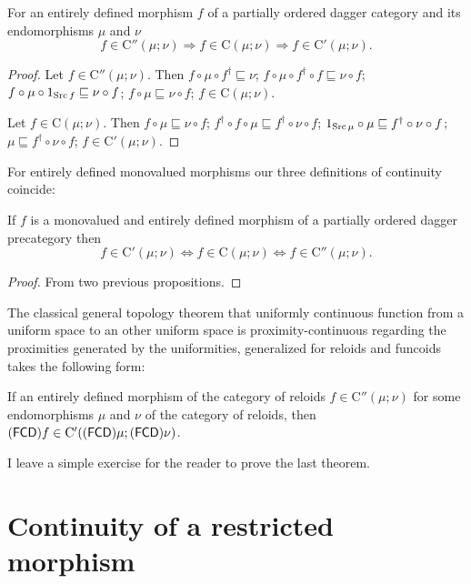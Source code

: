 \begin{prop}
For an entirely defined morphism $f$ of a partially ordered dagger
category and its endomorphisms $\mu$ and $\nu$
\[
f\in\mathrm{C}''(\mu;\nu)\Rightarrow f\in\mathrm{C}(\mu;\nu)\Rightarrow f\in\mathrm{C}'(\mu;\nu).
\]
\end{prop}
\begin{proof}
Let $f\in\mathrm{C}''(\mu;\nu)$. Then $f\circ\mu\circ f^{\dagger}\sqsubseteq\nu$;
$f\circ\mu\circ f^{\dagger}\circ f\sqsubseteq\nu\circ f$; $f\circ\mu\circ1_{\operatorname{Src} f}\sqsubseteq\nu\circ f$;
$f\circ\mu\sqsubseteq\nu\circ f$; $f\in\mathrm{C}(\mu;\nu)$.

Let $f\in\mathrm{C}(\mu;\nu)$. Then $f\circ\mu\sqsubseteq\nu\circ f$;
$f^{\dagger}\circ f\circ\mu\sqsubseteq f^{\dagger}\circ\nu\circ f$;
$1_{\operatorname{Src}\mu}\circ\mu\sqsubseteq f^{\dagger}\circ\nu\circ f$; $\mu\sqsubseteq f^{\dagger}\circ\nu\circ f$;
$f\in\mathrm{C}'(\mu;\nu)$.
\end{proof}
For entirely defined monovalued morphisms our three definitions of
continuity coincide:
\begin{thm}
If $f$ is a monovalued and entirely defined morphism of a partially
ordered dagger precategory then
\[
f\in\mathrm{C}'(\mu;\nu)\Leftrightarrow f\in\mathrm{C}(\mu;\nu)\Leftrightarrow f\in\mathrm{C}''(\mu;\nu).
\]
\end{thm}
\begin{proof}
From two previous propositions.
\end{proof}
The classical general topology theorem that uniformly continuous function
from a uniform space to an other uniform space is proximity-continuous
regarding the proximities generated by the uniformities, generalized
for reloids and funcoids takes the following form:
\begin{thm}
If an entirely defined morphism of the category of reloids $f\in\mathrm{C}''(\mu;\nu)$
for some endomorphisms $\mu$ and $\nu$ of the category of reloids,
then $\mathsf{(\mathsf{FCD})}f\in\mathrm{C}'((\mathsf{FCD})\mu;(\mathsf{FCD})\nu)$.\end{thm}
\begin{xca}
I leave a simple exercise for the reader to prove the last theorem.
\end{xca}

\section{Continuity of a restricted
morphism}

